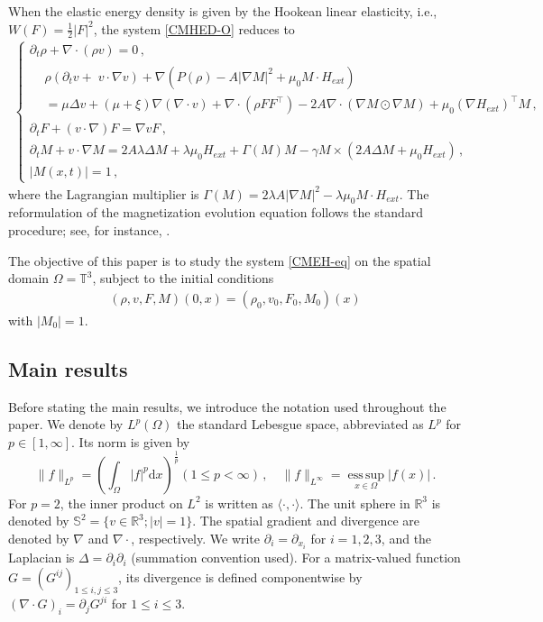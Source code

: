 \documentclass[reqno,11pt]{amsart}
\numberwithin{equation}{section}
\def\p{\partial}
\begin{document}
When the elastic energy density is given by the Hookean linear elasticity, i.e., $W (F) = \frac{1}{2} |F|^2$, the system \eqref{CMHED-O} reduces to
\begin{align}\label{CMEH-eq}
	\begin{cases}
		\p_t \rho + \nabla \cdot (\rho v) = 0 \,, \\
		\begin{aligned}
			& \rho (\p_t v +\; v \cdot \nabla v) + \nabla \left( P(\rho) - A |\nabla M|^2 + \mu_0 M \cdot H_{ext} \right) 
			\\[5pt] & 
			=  \mu\Delta v+(\mu+\xi)\nabla(\nabla \cdot v)+\nabla\cdot(\rho F F^\top)-2A \nabla \cdot ( \nabla M \odot \nabla M) + \mu_0 (\nabla H_{ext})^\top M \,, 
		\end{aligned} \\
		\partial_t F + (v \cdot \nabla) F = \nabla v F \,, \\
		\p_t M + v \cdot \nabla M = 2A\lambda \Delta M+\lambda \mu_0 H_{ext}+\Gamma(M)M-\gamma M \times(2A \Delta M+\mu_0 H_{ext})
		\,, \\ 
		|M(x,t)| = 1 \,,
	\end{cases}
\end{align}
where the Lagrangian multiplier is $\Gamma(M)=2\lambda A|\nabla M|^2-\lambda \mu_0 M\cdot H_{ext}$. The reformulation of the magnetization evolution equation follows the standard procedure; see, for instance, \cite{JLL-JDE-2023}.

The objective of this paper is to study the system \eqref{CMEH-eq} on the spatial domain $\Omega = \mathbb{T}^3$, subject to the initial conditions
\begin{equation}\label{IC-1}
  \begin{aligned}
    ( \rho, v, F, M ) (0, x) = (\rho_0, v_0, F_0, M_0) (x)
  \end{aligned}
\end{equation}
with $|M_0| = 1$.

\subsection{Main results}

Before stating the main results, we introduce the notation used throughout the paper. We denote by $ L^{p}(\Omega) $ the standard Lebesgue space, abbreviated as $ L^{p} $ for $ p\in[1,\infty] $. Its norm is given by 
$$ \|f\|_{L^{p}}=\left(\int_{\Omega}|f|^{p}\mathrm{d}x\right)^{\frac{1}{p}} ( 1 \leq p < \infty) \,,  \quad  \|f\|_{L^{\infty}}=\operatorname*{ess\, sup}_{x\in \Omega}|f(x)| \,. $$ 
For $ p=2 $, the inner product on $ L^{2} $ is written as $ \langle\cdot,\cdot\rangle $. The unit sphere in $\mathbb{R}^3$ is denoted by $ \mathbb{S}^{2}=\{v \in\mathbb{R}^3;|v |=1\} $. The spatial gradient and divergence are denoted by $ \nabla $ and $ \nabla\cdot $, respectively. We write $ \partial_{i} = \partial_{x_{i}} $ for $ i=1,2,3 $, and the Laplacian is $ \Delta=\partial_{i}\partial_{i} $ (summation convention used). For a matrix-valued function $ G=(G^{ij})_{1\leq i,j\leq 3} $, its divergence is defined componentwise by $ (\nabla\cdot G)_{i}=\partial_{j}G^{ji} $ for $ 1\leq i\leq 3 $. 
\end{document}
